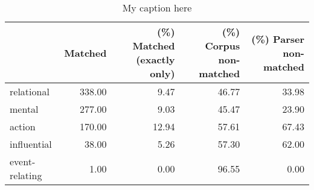 \begin{table}[!ht]
\centering
\begin{tabular}{lrrrr}
\toprule
{} &  Matched &  (\%) Matched (exactly only) &  (\%) Corpus non-matched &  (\%) Parser non-matched \\
\midrule
relational     &   338.00 &                        9.47 &                   46.77 &                   33.98 \\
mental         &   277.00 &                        9.03 &                   45.47 &                   23.90 \\
action         &   170.00 &                       12.94 &                   57.61 &                   67.43 \\
influential    &    38.00 &                        5.26 &                   57.30 &                   62.00 \\
event-relating &     1.00 &                        0.00 &                   96.55 &                    0.00 \\
\bottomrule
\end{tabular}
\caption{My caption here}
\label{tab:PROCESS_TYPE-oe-relative}
\end{table}